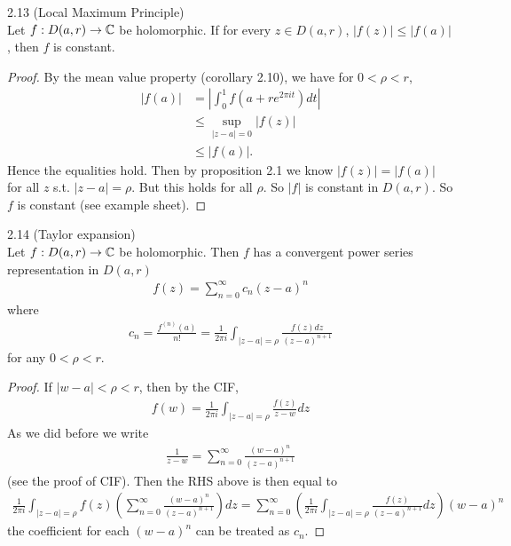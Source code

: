 \documentclass[a4paper]{article}
\begin{document}
\begin{thm} 2.13 (Local Maximum Principle)\\
Let $f:D(a,r) \to \mathbb{C}$ be holomorphic. If for every $z \in D(a,r)$, $|f(z)|\leq |f(a)|$, then $f$ is constant.
\begin{proof}
By the mean value property (corollary 2.10), we have for $0<\rho < r$, 
\begin{equation*}
\begin{aligned}
|f(a)| &= \left| \int_0^1 f(a+re^{2\pi it}) dt\right|\\
&\leq \sup_{|z-a|=0} |f(z)|\\
&\leq |f(a)|.
\end{aligned}
\end{equation*}
Hence the equalities hold. Then by proposition 2.1 we know $|f(z)| = |f(a)|$ for all $z$ s.t. $|z-a| = \rho$. But this holds for all $\rho$. So $|f|$ is constant in $D(a,r)$. So $f$ is constant (see example sheet).
\end{proof}
\end{thm}

\begin{thm} 2.14 (Taylor expansion)\\
Let $f:D (a,r) \to \mathbb{C}$ be holomorphic. Then $f$ has a convergent power series representation in $D(a,r)$
\begin{equation*}
\begin{aligned}
f(z) = \sum_{n=0}^\infty c_n (z-a)^n
\end{aligned}
\end{equation*}
where
\begin{equation*}
\begin{aligned}
c_n = \frac{f^{(n)} (a)}{n!} = \frac{1}{2\pi i} \int_{|z-a|=\rho} \frac{f(z)dz}{(z-a)^{n+1}}
\end{aligned}
\end{equation*}
for any $0<\rho<r$.
\begin{proof}
If $|w-a| < \rho < r$, then by the CIF,
\begin{equation*}
\begin{aligned}
f(w) = \frac{1}{2\pi i} \int_{|z-a|=\rho} \frac{f(z)}{z-w} dz
\end{aligned}
\end{equation*}
As we did before we write
\begin{equation*}
\begin{aligned}
\frac{1}{z-w} = \sum_{n=0}^\infty \frac{(w-a)^n}{(z-a)^{n+1}}
\end{aligned}
\end{equation*}
(see the proof of CIF). Then the RHS above is then equal to
\begin{equation*}
\begin{aligned}
\frac{1}{2\pi i} \int_{|z-a| = \rho} f(z) \left(\sum_{n=0}^\infty \frac{(w-a)^n}{(z-a)^{n+1}}\right) dz = \sum_{n=0}^\infty \left(\frac{1}{2\pi i} \int_{|z-a|=\rho} \frac{f(z)}{(z-a)^{n+1}} dz\right) (w-a)^n
\end{aligned}
\end{equation*}
the coefficient for each $(w-a)^n$ can be treated as $c_n$.
\end{proof}
\end{thm}
\end{document}
